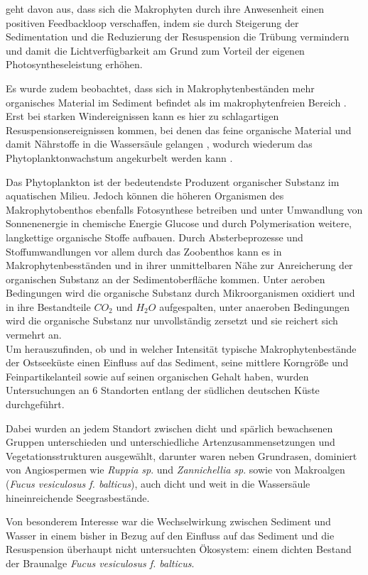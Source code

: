 \cite{madsen_2001} geht davon aus, dass sich die Makrophyten durch ihre Anwesenheit einen positiven Feedbackloop verschaffen, indem sie durch Steigerung der Sedimentation und die Reduzierung der Resuspension die Trübung vermindern und damit die Lichtverfügbarkeit am Grund zum Vorteil der eigenen Photosyntheseleistung erhöhen.

Es wurde zudem beobachtet, dass sich in Makrophytenbeständen mehr organisches Material im Sediment befindet als im makrophytenfreien Bereich \cite{kenworthy_1982}. Erst bei starken Windereignissen kann es hier zu schlagartigen Resuspensionsereignissen kommen, bei denen das feine organische Material und damit Nährstoffe in die Wassersäule gelangen \citep{dauby_1995}, wodurch wiederum das Phytoplanktonwachstum angekurbelt werden kann \citep{cowan_1996}. 

Das Phytoplankton ist der bedeutendste Produzent organischer Substanz im aquatischen Milieu. Jedoch können die höheren Organismen des Makrophytobenthos ebenfalls Fotosynthese betreiben und unter Umwandlung von Sonnenenergie in chemische Energie Glucose und durch Polymerisation weitere, langkettige organische Stoffe aufbauen. Durch Absterbeprozesse und Stoffumwandlungen vor allem durch das Zoobenthos kann es in Makrophytenbesständen und in ihrer unmittelbaren Nähe zur Anreicherung der organischen Substanz an der Sedimentoberfläche kommen. Unter aeroben Bedingungen wird die organische Substanz durch Mikroorganismen oxidiert und in ihre Bestandteile $ CO_2 $ und $ H_2O $ aufgespalten, unter anaeroben Bedingungen wird die organische Substanz nur unvollständig zersetzt und sie reichert sich vermehrt an.
\\

Um herauszufinden, ob und in welcher Intensität typische Makrophytenbestände der Ostseeküste einen Einfluss auf das Sediment, seine mittlere Korngröße und Feinpartikelanteil sowie auf seinen organischen Gehalt haben, wurden Untersuchungen an 6 Standorten entlang der südlichen deutschen Küste durchgeführt.

Dabei wurden an jedem Standort zwischen dicht und spärlich bewachsenen Gruppen unterschieden und unterschiedliche Artenzusammensetzungen und Vegetationsstrukturen ausgewählt, darunter waren neben Grundrasen, dominiert von Angiospermen wie \textit{Ruppia sp}. und \textit{Zannichellia sp}. sowie von Makroalgen (\textit{Fucus vesiculosus f. balticus}), auch dicht und weit in die Wassersäule hineinreichende Seegrasbestände.

Von besonderem Interesse war die Wechselwirkung zwischen Sediment und Wasser in einem bisher in Bezug auf den Einfluss auf das Sediment und die Resuspension überhaupt nicht untersuchten Ökosystem: einem dichten Bestand der Braunalge \textit{Fucus vesiculosus f. balticus}. 

